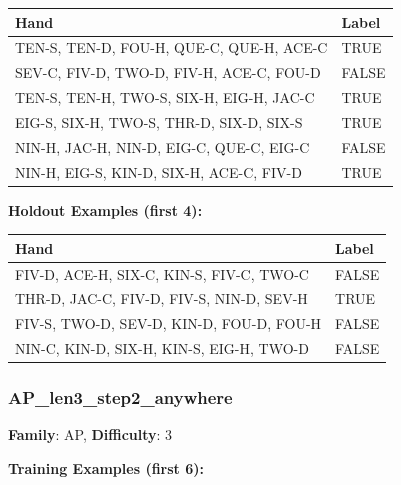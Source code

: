 \documentclass[10pt,a4paper]{article}
\begin{document}
\begin{small}
\begin{tabular}{p{8cm}l}
\toprule
Hand & Label \\
\midrule
TEN-S, TEN-D, FOU-H, QUE-C, QUE-H, ACE-C & \textcolor{positive}{TRUE} \\
SEV-C, FIV-D, TWO-D, FIV-H, ACE-C, FOU-D & \textcolor{negative}{FALSE} \\
TEN-S, TEN-H, TWO-S, SIX-H, EIG-H, JAC-C & \textcolor{positive}{TRUE} \\
EIG-S, SIX-H, TWO-S, THR-D, SIX-D, SIX-S & \textcolor{positive}{TRUE} \\
NIN-H, JAC-H, NIN-D, EIG-C, QUE-C, EIG-C & \textcolor{negative}{FALSE} \\
NIN-H, EIG-S, KIN-D, SIX-H, ACE-C, FIV-D & \textcolor{positive}{TRUE} \\
\bottomrule
\end{tabular}
\end{small}

\textbf{Holdout Examples (first 4):}

\begin{small}
\begin{tabular}{p{8cm}l}
\toprule
Hand & Label \\
\midrule
FIV-D, ACE-H, SIX-C, KIN-S, FIV-C, TWO-C & \textcolor{negative}{FALSE} \\
THR-D, JAC-C, FIV-D, FIV-S, NIN-D, SEV-H & \textcolor{positive}{TRUE} \\
FIV-S, TWO-D, SEV-D, KIN-D, FOU-D, FOU-H & \textcolor{negative}{FALSE} \\
NIN-C, KIN-D, SIX-H, KIN-S, EIG-H, TWO-D & \textcolor{negative}{FALSE} \\
\bottomrule
\end{tabular}
\end{small}

\vspace{0.5cm}

\subsubsection{AP\_len3\_step2\_anywhere}

\textbf{Family}: AP, \textbf{Difficulty}: 3

\textbf{Training Examples (first 6):}
\end{document}
